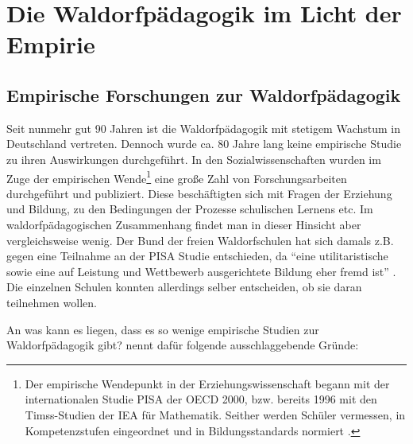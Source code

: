 \section{Die Waldorfpädagogik im Licht der Empirie}
\subsection{Empirische Forschungen zur Waldorfpädagogik} %
\label{sub:empirische_forschung}


Seit nunmehr gut 90 Jahren ist die Waldorfpädagogik mit stetigem Wachstum in Deutschland vertreten. Dennoch wurde ca. 80 Jahre lang keine empirische Studie zu ihren Auswirkungen durchgeführt. In den Sozialwissenschaften wurden im Zuge der empirischen Wende\footnote{Der empirische Wendepunkt in der Erziehungswissenschaft begann mit der internationalen Studie PISA der OECD 2000, bzw. bereits 1996 mit den Timss-Studien der IEA für Mathematik. Seither werden Schüler vermessen, in Kompetenzstufen eingeordnet und in Bildungsstandards normiert \citep[vgl.][]{arp11}.} eine große Zahl von Forschungsarbeiten durchgeführt und publiziert. Diese beschäftigten sich mit Fragen der Erziehung und Bildung, zu den Bedingungen der Prozesse schulischen Lernens etc. Im waldorfpädagogischen Zusammenhang findet man in dieser Hinsicht aber vergleichsweise wenig. Der Bund der freien Waldorfschulen hat sich damals z.B. gegen eine Teilnahme an der PISA Studie entschieden, da \enquote{eine utilitaristische sowie eine auf Leistung und Wettbewerb ausgerichtete Bildung eher fremd ist} \citep[vgl.][S.127ff]{paschen10}.  Die einzelnen Schulen konnten allerdings selber entscheiden, ob sie daran teilnehmen wollen.

An was kann es liegen, dass es so wenige empirische Studien zur Waldorfpädagogik gibt? \cite[S. 127f]{paschen10} nennt dafür folgende ausschlaggebende Gründe:

